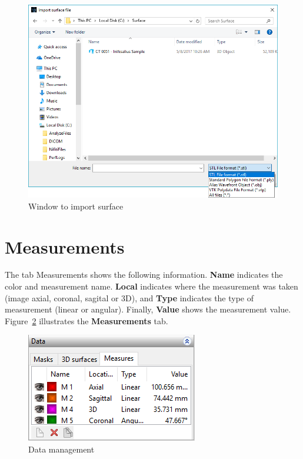 \begin{figure}[!htb]
\centering
\includegraphics[scale=0.4]{../user_guide_figures/invesalius_screen/import_surface_en.png}
\caption{Window to import surface}
\label{fig:import_surface}
\end{figure}

\newpage


\section{Measurements}

The tab Measurements shows the following information. \textbf{Name} indicates the color and measurement name. \textbf{Local} indicates where the measurement was taken (image axial, coronal, sagital or 3D), and \textbf{Type} indicates the type of measurement (linear or angular). Finally, \textbf{Value} shows the measurement value. Figure~\ref{fig:manager_mensuares} illustrates the \textbf{Measurements} tab.

\begin{figure}[!htb]
\centering
\includegraphics[scale=0.7]{../user_guide_figures/invesalius_screen/painel_measures_manager_en.png}
\caption{Data management}
\label{fig:manager_mensuares}
\end{figure}

